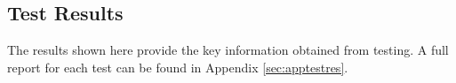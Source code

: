 \pagebreak

\subsection{Test Results} \label{sec:5.3}
The results shown here provide the key information obtained from testing. A full report for each test can be found in Appendix \ref{sec:apptestres}.

